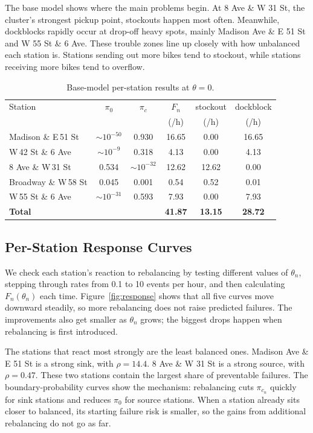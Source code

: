 \documentclass[conference]{IEEEtran}
\begin{document}
The base model shows where the main problems begin. At 8 Ave \& W 31 St, the cluster's strongest pickup point, stockouts happen most often. Meanwhile, dockblocks rapidly occur at drop-off heavy spots, mainly Madison Ave \& E 51 St and W 55 St \& 6 Ave. These trouble zones line up closely with how unbalanced each station is. Stations sending out more bikes tend to stockout, while stations receiving more bikes tend to overflow.


\begin{table}[t]
\caption{Base-model per-station results at $\theta = 0$.}
\label{tab:base}
\centering
\renewcommand{\arraystretch}{1.1}
\setlength{\tabcolsep}{3pt}
\begin{tabular}{@{}lccccc@{}}
\toprule
Station & $\pi_0$ & $\pi_c$ & $F_n$ & stockout & dockblock \\
& & & (/h) & (/h) & (/h) \\
\midrule
Madison \& E\,51 St   & $\sim\!10^{-50}$ & 0.930 & 16.65 & 0.00  & 16.65 \\
W\,42 St \& 6 Ave      & $\sim\!10^{-9}$  & 0.318 & 4.13  & 0.00  & 4.13  \\
8 Ave \& W\,31 St      & 0.534            & $\sim\!10^{-32}$ & 12.62 & 12.62 & 0.00  \\
Broadway \& W\,58 St   & 0.045            & 0.001 & 0.54  & 0.52  & 0.01  \\
W\,55 St \& 6 Ave      & $\sim\!10^{-31}$ & 0.593 & 7.93  & 0.00  & 7.93  \\
\midrule
\textbf{Total}         &                  &       & \textbf{41.87} & \textbf{13.15} & \textbf{28.72} \\
\bottomrule
\end{tabular}
\end{table}


\subsection{Per-Station Response Curves}

We check each station's reaction to rebalancing by testing different values of $\theta_n$, stepping through rates from 0.1 to 10 events per hour, and then calculating $F_n(\theta_n)$ each time. Figure~\ref{fig:response} shows that all five curves move downward steadily, so more rebalancing does not raise predicted failures. The improvements also get smaller as $\theta_n$ grows; the biggest drops happen when rebalancing is first introduced.

The stations that react most strongly are the least balanced ones. Madison Ave \& E 51 St is a strong sink, with $\rho=14.4$. 8 Ave \& W 31 St is a strong source, with $\rho=0.47$. These two stations contain the largest share of preventable failures. The boundary-probability curves show the mechanism: rebalancing cuts $\pi_{c_n}$ quickly for sink stations and reduces $\pi_0$ for source stations. When a station already sits closer to balanced, its starting failure risk is smaller, so the gains from additional rebalancing do not go as far.
\end{document}
